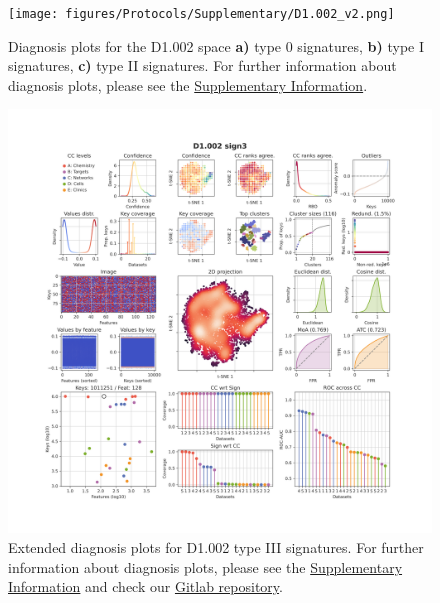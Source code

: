 \begin{figure}[htbp]
  \centering
  \texttt{[image: figures/Protocols/Supplementary/D1.002\_v2.png]}
  \caption{
    Diagnosis plots for the D1.002 space
    \textbf{a)} type 0 signatures,
    \textbf{b)} type I signatures,
    \textbf{c)} type II signatures. For further information about diagnosis plots, please see the \hyperref[Supplementary_Protocols_Diagnosis]{Supplementary Information}.
  }
  \label{Protocols_FigS4}
\end{figure}

\begin{figure}[htbp]
  \centering
  \includegraphics[width=1\linewidth]{figures/Protocols/Supplementary/D1.002_sign3_local_CC_D1_sign0_medium.png}
  \caption{
    Extended diagnosis plots for D1.002 type III signatures. For further information about diagnosis plots, please see the \hyperref[Supplementary_Protocols_Diagnosis]{Supplementary Information} and check our \href{https://gitlabsbnb.irbbarcelona.org/packages/protocols}{Gitlab repository}.
  }
  \label{Protocols_FigS5}
\end{figure}

